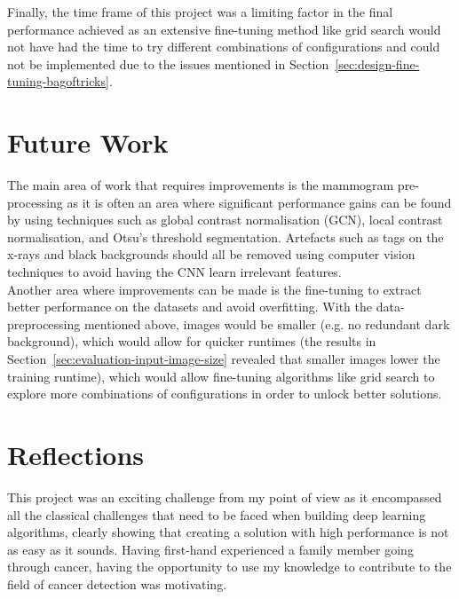 Finally, the time frame of this project was a limiting factor in the final performance achieved as an extensive fine-tuning method like grid search would not have had the time to try different combinations of configurations and could not be implemented due to the issues mentioned in Section~\ref{sec:design-fine-tuning-bagoftricks}.
    

\section{Future Work}

The main area of work that requires improvements is the mammogram pre-processing as it is often an area where significant performance gains can be found \citep{Litjens2017} by using techniques such as global contrast normalisation (GCN), local contrast normalisation, and Otsu’s threshold segmentation. Artefacts such as tags on the x-rays and black backgrounds should all be removed using computer vision techniques to avoid having the CNN learn irrelevant features.\\

Another area where improvements can be made is the fine-tuning to extract better performance on the datasets and avoid overfitting. With the data-preprocessing mentioned above, images would be smaller (e.g. no redundant dark background), which would allow for quicker runtimes (the results in Section~\ref{sec:evaluation-input-image-size} revealed that smaller images lower the training runtime), which would allow fine-tuning algorithms like grid search to explore more combinations of configurations in order to unlock better solutions.
    

\section{Reflections}

This project was an exciting challenge from my point of view as it encompassed all the classical challenges that need to be faced when building deep learning algorithms, clearly showing that creating a solution with high performance is not as easy as it sounds. Having first-hand experienced a family member going through cancer, having the opportunity to use my knowledge to contribute to the field of cancer detection was motivating.